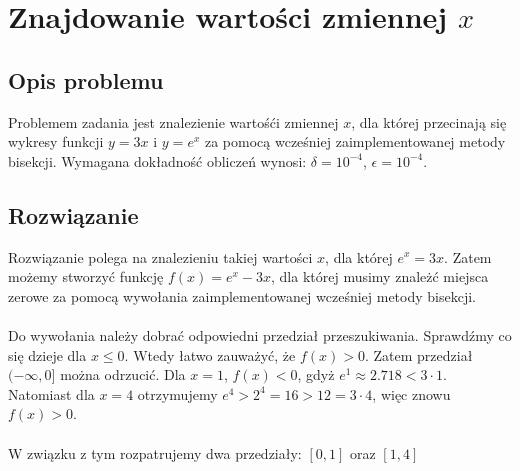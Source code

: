 \documentclass{article}
\begin{document}
\section{Znajdowanie wartości zmiennej $x$}
\subsection{Opis problemu}
Problemem zadania jest znalezienie wartośći zmiennej $x$, dla której przecinają się wykresy funkcji $y = 3x$ i $y = e^x$ za pomocą wcześniej zaimplementowanej metody bisekcji. Wymagana dokładność obliczeń wynosi: $\delta = 10^{-4}$, $\epsilon = 10^{-4}$.
\subsection{Rozwiązanie}
Rozwiązanie polega na znalezieniu takiej wartości $x$, dla której $e^x = 3x$. Zatem możemy stworzyć funkcję $f(x) = e^x - 3x$, dla której musimy znależć miejsca zerowe za pomocą wywołania zaimplementowanej wcześniej metody bisekcji. 
\\ \\ Do wywołania należy dobrać odpowiedni przedział przeszukiwania.  Sprawdźmy co się dzieje dla $x \leq 0$. Wtedy łatwo zauważyć, że $f(x) > 0$. Zatem przedział $(-\infty, 0]$ można odrzucić. Dla $x = 1$, $f(x) < 0$, gdyż $e^1 \approx 2.718 < 3 \cdot 1$. Natomiast dla $x = 4$ otrzymujemy $e^4 > 2^4 = 16 > 12 = 3 \cdot 4$, więc znowu $f(x) > 0$. 
\\ \\W związku z tym rozpatrujemy dwa przedziały: $[0, 1]$ oraz $[1, 4]$
\end{document}
